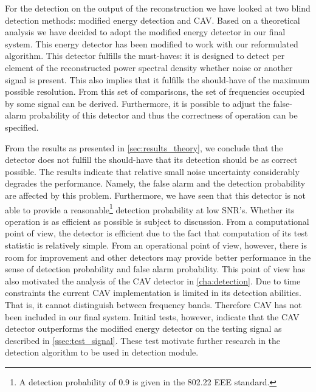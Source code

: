 \documentclass[a4paper, openany, oneside]{memoir}
\begin{document}
For the detection on the output of the reconstruction we have looked at two blind detection methods: modified energy detection and CAV. Based on  a theoretical analysis we have decided to adopt the modified energy detector in our final system. This energy detector has been modified to work with our reformulated algorithm. This detector fulfills the must-haves: it is designed to detect per element of the reconstructed power spectral
density whether noise or another signal is present. This also implies that it fulfills the should-have of the maximum possible resolution.  From this set of comparisons, the set of frequencies occupied by some signal can be derived. Furthermore, it is possible to adjust the false-alarm probability of this detector and thus the correctness of operation can be specified. 

From the results as presented in \cref{sec:results_theory}, we conclude that the detector does not fulfill the should-have that its detection should be as correct possible. The results indicate that relative small noise uncertainty considerably degrades the  performance. Namely, the false alarm and the detection probability are affected by this problem. Furthermore, we have seen that this detector is not able to provide a reasonable\footnote{A detection probability of $0.9$ is given in the 802.22 EEE standard.} detection probability at low SNR's. Whether its operation is as efficient as possible is subject  to discussion. From a computational point of view, the detector is efficient due to the fact that computation of its test statistic is relatively simple. From an operational point of view, however, there is room for improvement and other detectors may provide better performance in the sense of detection probability and false alarm probability. This point of view has also motivated the analysis of the CAV detector in \cref{cha:detection}. Due to time constraints the current CAV implementation is limited in its detection abilities. That is, it cannot distinguish between frequency bands. Therefore CAV has not been included in our final system. Initial tests, however, indicate that the CAV detector outperforms the modified energy detector on the testing signal as described in \cref{ssec:test_signal}. These test motivate further research in the detection algorithm to be used in detection module. 
\end{document}
